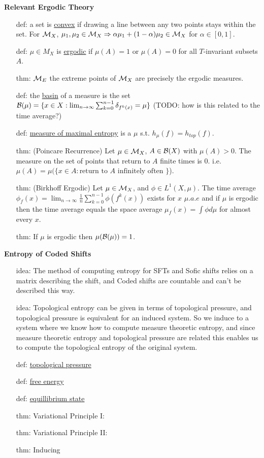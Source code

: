 \documentclass[11pt, reqno]{amsart}
\theoremstyle{plain}
\numberwithin{thm}{subsection}
\theoremstyle{definition}
\begin{document}
{\begin{multicols}{2}
\textbf{Relevant Ergodic Theory}
\begin{itemize}[leftmargin=2.3em]
\item[def:] a set is \underline{convex} if drawing a line between any two points stays within the set. For $\mathcal{M}_X$,  $\mu_1, \mu_2 \in \mathcal{M}_X \Rightarrow \alpha\mu_1 + (1-\alpha)\mu_2 \in \mathcal{M}_X$ for $\alpha \in [0,1]$.
\item[def:] $\mu \in M_X$ is \underline{ergodic} if $\mu(A) = 1$ or $\mu(A) = 0$ for all $T$-invariant subsets $A$.
\item[thm:] $\mathcal{M}_E$ the extreme points of $\mathcal{M}_X$ are precisely the ergodic measures.
\item[def:] the \underline{basin} of a measure is the set $\mathcal{B}(\mu) = \{x \in X : \lim_{n \rightarrow \infty} \sum_{k=0}^{n-1}\delta_{f^{k}(x)} = \mu\}$ (TODO: how is this related to the time average?)
\item[def:] \underline{measure of maximal entropy} is a $\mu$ s.t. $h_\mu(f) = h_{top}(f)$.
\item[thm:] (Poincare Recurrence) Let $\mu \in \mathcal{M}_X$, $A\in \mathcal{B}(X)$ with $\mu(A) > 0$. The measure on the set of points that return to $A$ finite times is 0. i.e. $\mu(A) = \mu(\{x \in A : \text{return to $A$ infinitely often }\}$).
\item[thm:] (Birkhoff Ergodic) Let $\mu \in \mathcal{M}_X$, and $\phi \in L^1(X,\mu)$. The time average $\phi_f(x) = \lim_{n \rightarrow \infty}\frac{1}{n} \sum_{k=0}^{n-1}\phi(f^k(x))$ exists for $x$ $\mu.a.e$ and if $\mu$ is ergodic then the time average equals the space average  $\mu_f(x) = \int \phi d\mu$ for almost every $x$.
\item[thm:] If $\mu$ is ergodic then $\mu(\mathcal{B}(\mu)) = 1$.  
\end{itemize}

\textbf{Entropy of Coded Shifts}
\begin{itemize}[leftmargin=2.3em]
  \item[idea:] The method of computing entropy for SFTs and Sofic shifts relies on a matrix describing the shift, and Coded shifts are countable and can't be described this way.
  \item[idea:] Topological entropy can be given in terms of topological pressure, and topological pressure is equivalent for an induced system. So we induce to a system where we know how to compute measure theoretic entropy, and since measure theoretic entropy and topological pressure are related this enables us to compute the  topological entropy of the original system.
  \item[def:] \underline{topological pressure}
  \item[def:] \underline{free energy}
  \item[def:] \underline{equillibrium state}
  \item[thm:] Variational Principle I:  
  \item[thm:] Variational Principle II:
  \item[thm:] Inducing   
\end{itemize}



\end{multicols}}
\end{document}
